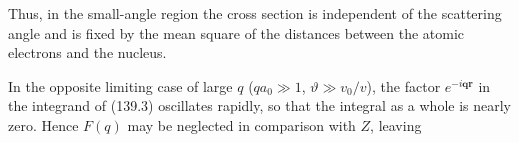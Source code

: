 Thus, in the small-angle region the cross section is independent of the scattering angle and is fixed by the mean square of the distances between the atomic electrons and the nucleus.

In the opposite limiting case of large $q$ ($qa_0\gg1$, $\vartheta\gg v_0/v$), the factor $e^{-i\mathbf{qr}}$ in the integrand of (139.3) oscillates rapidly, so that the integral as a whole is nearly zero. Hence $F(q)$ may be neglected in comparison with $Z$, leaving

